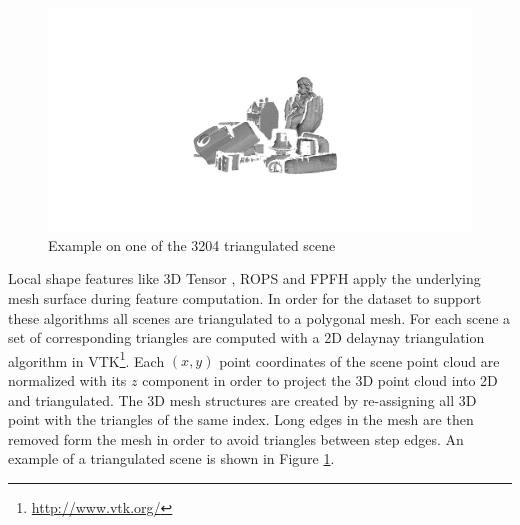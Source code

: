 \documentclass[10pt,twocolumn,letterpaper]{article}
\begin{document}
\begin{figure}[ht]
\centering
\includegraphics[clip, trim=14cm 6cm 13cm 8cm,width=1.0\linewidth, height= 1.0\linewidth, keepaspectratio]{img/mesh_scene.png}
\caption{Example on one of the 3204 triangulated scene}
\label{fig:mesh_scene}
\end{figure}
Local shape features like 3D Tensor \cite{Mian2006}, ROPS \cite{Guo2013} and FPFH \cite{Fpfh2009} apply the underlying mesh surface during feature computation. In order for the dataset to support these algorithms all scenes are triangulated to a polygonal mesh. For each scene a set of corresponding triangles are computed with a 2D delaynay triangulation algorithm in VTK\footnote{\url{http://www.vtk.org/}}. Each $(x,y)$ point coordinates of the scene point cloud are normalized with its $z$ component in order to project the 3D point cloud into 2D and triangulated. The 3D mesh structures are created by re-assigning all 3D point with the triangles of the same index. Long edges in the mesh are then removed form the mesh in order to avoid triangles between step edges. An example of a triangulated scene is shown in Figure \ref{fig:mesh_scene}.
\end{document}
